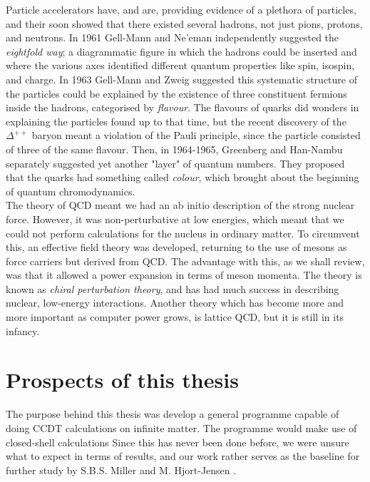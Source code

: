 \documentclass[10pt,twoside]{report}
\begin{document}
	Particle accelerators have, and are, providing evidence  of a plethora of particles, and their soon showed that there existed several hadrons, not just pions, protons, and neutrons. In 1961 Gell-Mann and Ne'eman independently suggested the \emph{eightfold way}; a diagrammatic figure in which the hadrons could be inserted and where the various axes identified different quantum properties like spin, isospin, and charge. In 1963 Gell-Mann and Zweig suggested this systematic structure of the particles could be explained by the existence of three constituent fermions inside the hadrons, categorised by \emph{flavour}. The flavours of quarks did wonders in explaining the particles found up to that time, but the recent discovery of the $\Delta^{++}$ baryon meant a violation of the Pauli principle, since the particle consisted of three of the same flavour. Then, in 1964-1965, Greenberg and Han-Nambu separately suggested yet another "layer" of quantum numbers. They proposed that the quarks had something called \emph{colour}, which brought about the beginning of quantum chromodynamics.\\
	
	The theory of QCD meant we had an ab initio description of the strong nuclear force. However, it was non-perturbative at low energies, which meant that we could not perform calculations for the nucleus in ordinary matter. To circumvent this, an effective field theory was developed, returning to the use of mesons as force carriers but derived from QCD. The advantage with this, as we shall review, was that it allowed a power expansion in terms of meson momenta. The theory is known as \emph{chiral perturbation theory}, and has had much success in describing nuclear, low-energy interactions. Another theory which has become more and more important as computer power grows, is lattice QCD, but it is still in its infancy.\\
	
	\section{Prospects of this thesis}
	The purpose behind this thesis was develop a general programme capable of doing CCDT calculations on infinite matter. The programme would make use of closed-shell calculations Since this has never been done before, we were unsure what to expect in terms of results, and our work rather serves as the baseline for further study by S.B.S. Miller and M. Hjort-Jensen \cite{MillerHjorthJensen17}.\\
	
\end{document}
